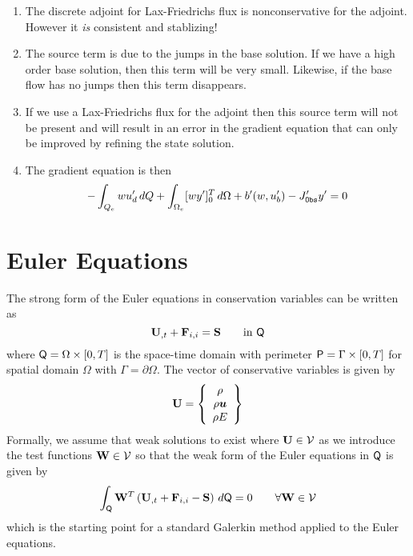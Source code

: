 \documentclass[12pt]{article}
\begin{document}
\medskip
{}
\begin{enumerate}
\item The discrete adjoint for Lax-Friedrichs flux is nonconservative for the
  adjoint. However it {\em is} consistent and stablizing!
\item The source term is due to the jumps in the base solution.  If we have a
  high order base solution, then this term will be very small. Likewise, if
  the base flow has no jumps then this term disappears.
\item If we use a Lax-Friedrichs flux for the adjoint then this source term
  will not be present and will result in an error in the gradient equation
  that can only be improved by refining the state solution.
\item The gradient equation is then
\[ -\int_{Q_e} w u_d' \, dQ + \int_{\Omega_e} [w y']_0^T \,d\Omega + 
   b'(w,u'_b) - J'_{\tt Obs} y' = 0 \]
\end{enumerate}


\section{Euler Equations}

The strong form of the Euler equations in conservation variables can be
written as
\begin{equation} \label{e:Euler_strong_form}
{{\bf U}}_{,t} + {\bf F}_{i,i} = {\bf S} \qquad\mbox{in }{\sf Q}
\end{equation}
where ${\sf Q}= \Omega \times [0,T]$ is the space-time domain with perimeter ${\sf P}
= \Gamma \times [0,T]$ for spatial domain $\Omega$ with
$\Gamma=\partial\Omega$.  The vector of conservative variables is given by
\begin{equation}
{{\bf U}} = \left\{ \begin{array}{c} \rho \\ \rho {\boldsymbol u} \\ \rho E \end{array} \right\}
\end{equation}
Formally, we assume that weak solutions to  exist
where ${{\bf U}} \in {\mathcal V}$ as we introduce the test functions ${\bf W} \in {\mathcal V}$ so that
the weak form of the Euler equations in ${\sf Q}$ is given by
\begin{equation}
\int_{\sf Q} {\bf W}^T \left({{\bf U}}_{,t} + {\bf F}_{i,i} - {\bf S} \right) \,d{\sf Q} = 0 
\qquad \forall {\bf W} \in {\mathcal V}
\end{equation}
which is the starting point for a standard Galerkin method applied to the
Euler equations.
\end{document}
